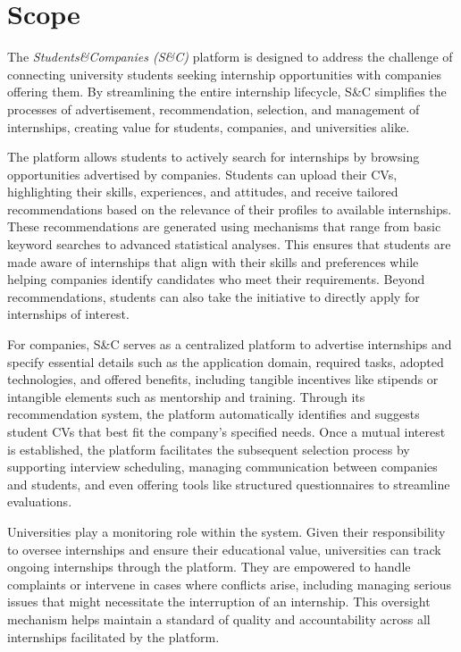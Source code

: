 \section{Scope}

The \textit{Students\&Companies (S\&C)} platform is designed to address the challenge of connecting university students seeking internship opportunities with companies offering them. By streamlining the entire internship lifecycle, S\&C simplifies the processes of advertisement, recommendation, selection, and management of internships, creating value for students, companies, and universities alike.

The platform allows students to actively search for internships by browsing opportunities advertised by companies. Students can upload their CVs, highlighting their skills, experiences, and attitudes, and receive tailored recommendations based on the relevance of their profiles to available internships. These recommendations are generated using mechanisms that range from basic keyword searches to advanced statistical analyses. This ensures that students are made aware of internships that align with their skills and preferences while helping companies identify candidates who meet their requirements. Beyond recommendations, students can also take the initiative to directly apply for internships of interest.

For companies, S\&C serves as a centralized platform to advertise internships and specify essential details such as the application domain, required tasks, adopted technologies, and offered benefits, including tangible incentives like stipends or intangible elements such as mentorship and training. Through its recommendation system, the platform automatically identifies and suggests student CVs that best fit the company’s specified needs. Once a mutual interest is established, the platform facilitates the subsequent selection process by supporting interview scheduling, managing communication between companies and students, and even offering tools like structured questionnaires to streamline evaluations.

Universities play a monitoring role within the system. Given their responsibility to oversee internships and ensure their educational value, universities can track ongoing internships through the platform. They are empowered to handle complaints or intervene in cases where conflicts arise, including managing serious issues that might necessitate the interruption of an internship. This oversight mechanism helps maintain a standard of quality and accountability across all internships facilitated by the platform.

